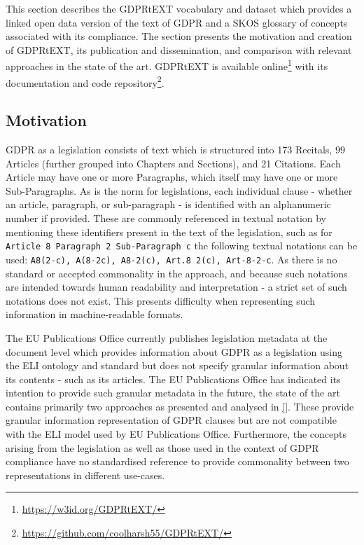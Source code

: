 This section describes the GDPRtEXT vocabulary and dataset which provides a linked open data version of the text of GDPR and a SKOS glossary of concepts associated with its compliance. The section presents the motivation and creation of GDPRtEXT, its publication and dissemination, and comparison with relevant approaches in the state of the art. GDPRtEXT is available online\footnote{\url{https://w3id.org/GDPRtEXT/}} with its documentation and code repository\footnote{\url{https://github.com/coolharsh55/GDPRtEXT/}}.

\subsection{Motivation}
GDPR as a legislation consists of text which is structured into 173 Recitals, 99 Articles (further grouped into Chapters and Sections), and 21 Citations. Each Article may have one or more Paragraphs, which itself may have one or more Sub-Paragraphs. As is the norm for legislations, each individual clause - whether an article, paragraph, or sub-paragraph - is identified with an alphanumeric number if provided. These are commonly referenced in textual notation by mentioning these identifiers present in the text of the legislation, such as for \texttt{Article 8 Paragraph 2 Sub-Paragraph c} the following textual notations can be used: \texttt{A8(2-c), A(8-2c), A8-2(c), Art.8 2(c), Art-8-2-c}. As there is no standard or accepted commonality in the approach, and because such notations are intended towards human readability and interpretation - a strict set of such notations does not exist. This presents difficulty when representing such information in machine-readable formats.

The EU Publications Office currently publishes legislation metadata at the document level which provides information about GDPR as a legislation using the ELI ontology and standard \cite{} but does not specify granular information about its contents - such as its articles. The EU Publications Office has indicated its intention to provide such granular metadata in the future, the state of the art contains primarily two approaches as presented and analysed in \autoref{}. These provide granular information representation of GDPR clauses but are not compatible with the ELI model used by EU Publications Office. Furthermore, the concepts arising from the legislation as well as those used in the context of GDPR compliance have no standardised reference to provide commonality between two representations in different use-cases. 

